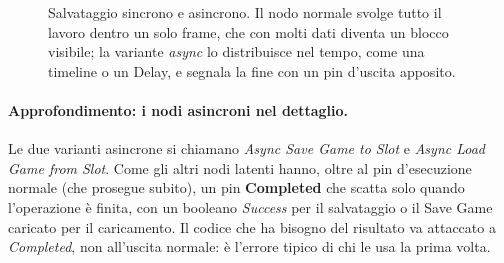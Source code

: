 \begin{figure}[htbp]
\centering
{}
\caption{Salvataggio sincrono e asincrono. Il nodo normale svolge tutto il
lavoro dentro un solo frame, che con molti dati diventa un blocco visibile; la
variante \emph{async} lo distribuisce nel tempo, come una timeline o un Delay,
e segnala la fine con un pin d'uscita apposito.}
\label{gd16:fig:async}
\end{figure}

\paragraph{Approfondimento: i nodi asincroni nel dettaglio.} Le due varianti
asincrone si chiamano \emph{Async Save Game to Slot} e \emph{Async Load Game
from Slot}. Come gli altri nodi latenti hanno, oltre al pin d'esecuzione
normale (che prosegue subito), un pin \textbf{Completed} che scatta solo quando
l'operazione è finita, con un booleano \emph{Success} per il salvataggio o il
Save Game caricato per il caricamento. Il codice che ha bisogno del risultato
va attaccato a \emph{Completed}, non all'uscita normale: è l'errore tipico di
chi le usa la prima volta.

